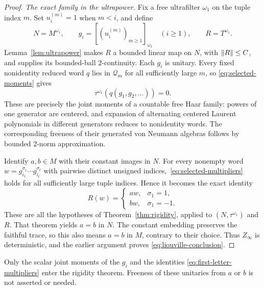\begin{proof}
\medskip\noindent
\emph{The exact family in the ultrapower.}
Fix a free ultrafilter $\omega_1$ on the tuple index $m$.  Set
$u_i^{(m)}=1$ when $m<i$, and define
\[
 N=M^{\omega_1},\qquad
 g_i=[(u_i^{(m)})_{m\ge1}]_{\omega_1}\quad(i\ge1),
 \qquad R=T^{\omega_1}.
\]
Lemma~\ref{lem:ultrapower} makes $R$ a bounded linear map on $N$,
with $\lVert R\rVert\le C$, and supplies its bounded-ball $2$-continuity.
Each $g_i$ is unitary.  Every fixed nonidentity reduced word $q$ lies
in $\mathcal Q_m$ for all sufficiently large $m$, so
\eqref{eq:selected-moments} gives
\begin{equation}\label{eq:exact-haar-family}
 \tau^{\omega_1}(q(g_1,g_2,\ldots))=0.
\end{equation}
These are precisely the joint moments of a countable free Haar
family: powers of one generator are centered, and expansion of
alternating centered Laurent polynomials in different generators
reduces to nonidentity words.  The corresponding freeness of their
generated von Neumann algebras follows by bounded $2$-norm
approximation.

Identify $a,b\in M$ with their constant images in $N$.  For every
nonempty word $w=g_{i_1}^{\sigma_1}\cdots g_{i_t}^{\sigma_t}$ with
pairwise distinct unsigned indices,~\eqref{eq:selected-multipliers}
holds for all sufficiently large tuple indices.  Hence it becomes the
exact identity
\begin{equation}\label{eq:first-letter-multipliers}
 R(w)=
 \begin{cases}
  aw,&\sigma_1=1,\\
  bw,&\sigma_1=-1.
 \end{cases}
\end{equation}
These are all the hypotheses of Theorem~\ref{thm:rigidity}, applied
to $(N,\tau^{\omega_1})$ and $R$.  That theorem yields $a=b$ in $N$.
The constant embedding preserves the faithful trace, so this also
means $a=b$ in $M$, contrary to their choice.  Thus $Z_\infty$ is
deterministic, and the earlier argument proves
\eqref{eq:liouville-conclusion}.
\end{proof}

Only the scalar joint moments of the $g_i$ and the identities
\eqref{eq:first-letter-multipliers} enter the rigidity theorem.
Freeness of these unitaries from $a$ or $b$ is not asserted or needed.
